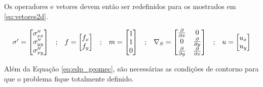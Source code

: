 Os operadores e vetores devem então ser redefinidos para os mostrados em \eqref{eq:vetores2d}.

\begin{equation}
\label{eq:vetores2d}
\begin{matrix}
\sigma^\prime = \begin{bmatrix}
\sigma^{\prime\prime}_{xx}
\\
\sigma^{\prime\prime}_{yy}
\\
\sigma^{\prime\prime}_{xy}
\end{bmatrix}
&

;

&

f = \begin{bmatrix}
f_{x}
\\
f_{y}
\end{bmatrix}
&
;
&

m = \begin{bmatrix} 1 \\ 1 \\ 0\end{bmatrix}

&
;

&
\nabla_S = \begin{bmatrix} \frac{\partial { }}{\partial x} & 0 \\ 0 & \frac{\partial { }}{\partial y} \\ \frac{\partial { }}{\partial y} & \frac{\partial { }}{\partial x} \\ \end{bmatrix}

&
;

&

u = \begin{bmatrix}
u_x
\\ 
u_y
\end{bmatrix}

\end{matrix}
\end{equation}

Além da Equação \eqref{eq:edp_geomec}, são necessárias as condições de contorno para que o problema fique totalmente definido. 
